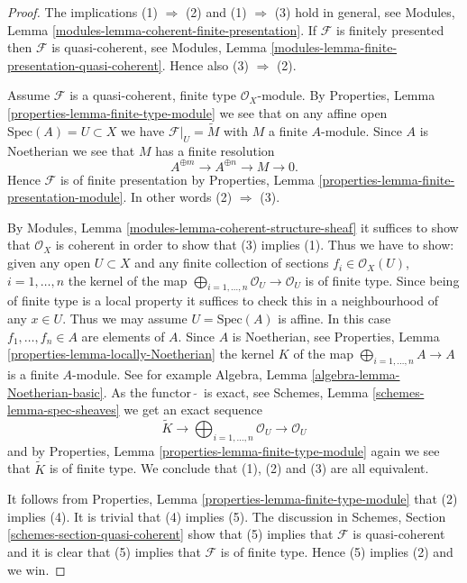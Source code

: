 \begin{proof}
The implications (1) $\Rightarrow$ (2) and (1) $\Rightarrow$ (3) hold
in general, see
Modules, Lemma \ref{modules-lemma-coherent-finite-presentation}.
If $\mathcal{F}$ is finitely presented then $\mathcal{F}$ is
quasi-coherent, see
Modules, Lemma \ref{modules-lemma-finite-presentation-quasi-coherent}.
Hence also (3) $\Rightarrow$ (2).

\medskip\noindent
Assume $\mathcal{F}$ is a quasi-coherent, finite type $\mathcal{O}_X$-module.
By
Properties, Lemma \ref{properties-lemma-finite-type-module}
we see that on any affine open
$\text{Spec}(A) = U \subset X$ we have $\mathcal{F}|_U = \widetilde M$
with $M$ a finite $A$-module. Since $A$ is Noetherian we see that
$M$ has a finite resolution
$$
A^{\oplus m} \to A^{\oplus n} \to M \to 0.
$$
Hence $\mathcal{F}$ is of finite presentation by
Properties, Lemma \ref{properties-lemma-finite-presentation-module}.
In other words (2) $\Rightarrow$ (3).

\medskip\noindent
By Modules, Lemma \ref{modules-lemma-coherent-structure-sheaf} it suffices
to show that $\mathcal{O}_X$ is coherent in order to show that (3)
implies (1). Thus we have to show: given any open $U \subset X$ and
any finite collection of sections $f_i \in \mathcal{O}_X(U)$,
$i = 1, \ldots, n$ the kernel of the map
$\bigoplus_{i = 1, \ldots, n} \mathcal{O}_U \to \mathcal{O}_U$
is of finite type. Since being of finite type is a local property
it suffices to check this in a neighbourhood of any $x \in U$.
Thus we may assume $U = \text{Spec}(A)$ is affine. In this case
$f_1, \ldots, f_n \in A$ are elements of $A$. Since $A$ is
Noetherian, see
Properties, Lemma \ref{properties-lemma-locally-Noetherian}
the kernel $K$ of the map $\bigoplus_{i = 1, \ldots, n} A \to A$
is a finite $A$-module. See for example
Algebra, Lemma \ref{algebra-lemma-Noetherian-basic}.
As the functor\ $\widetilde{ }$\ is exact, see
Schemes, Lemma \ref{schemes-lemma-spec-sheaves}
we get an exact sequence
$$
\widetilde K \to
\bigoplus\nolimits_{i = 1, \ldots, n} \mathcal{O}_U \to
\mathcal{O}_U
$$
and by
Properties, Lemma \ref{properties-lemma-finite-type-module}
again we see that $\widetilde K$ is of finite type. We conclude
that (1), (2) and (3) are all equivalent.

\medskip\noindent
It follows from
Properties, Lemma \ref{properties-lemma-finite-type-module}
that (2) implies (4). It is trivial that (4) implies (5).
The discussion in
Schemes, Section \ref{schemes-section-quasi-coherent}
show that (5) implies
that $\mathcal{F}$ is quasi-coherent and it is clear that (5)
implies that $\mathcal{F}$ is of finite type. Hence (5) implies
(2) and we win.
\end{proof}


